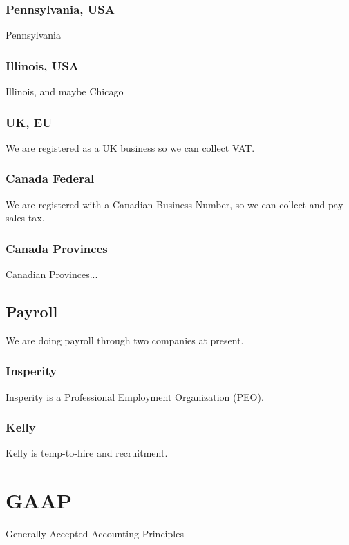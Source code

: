 \subsubsection{Pennsylvania, USA}
Pennsylvania

\subsubsection{Illinois, USA}
Illinois, and maybe Chicago

\subsubsection{UK, EU}
We are registered as a UK business so we can collect VAT.

\subsubsection{Canada Federal}
We are registered with a Canadian Business Number, so we
can collect and pay sales tax.

\subsubsection{Canada Provinces}
Canadian Provinces...

\subsection{Payroll}
We are doing payroll through two companies at present.

\subsubsection{Insperity}
Insperity is a Professional Employment Organization (PEO).

\subsubsection{Kelly}
Kelly is temp-to-hire and recruitment.

\section{GAAP}
Generally Accepted Accounting Principles

